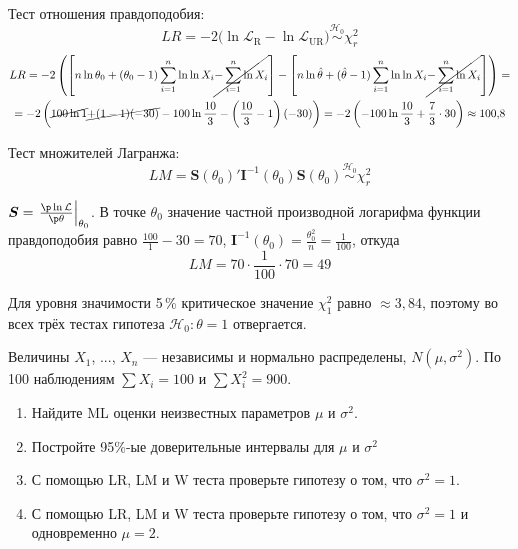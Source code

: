 \documentclass[pdftex,11pt,openany]{book}\usepackage[]{graphicx}\usepackage[]{color}
\newcommand{\calL}{\mathcal{L}}
\newcommand{\bs}[1]{\boldsymbol{#1}}
\newcommand{\hypo}{\mathcal{H}}
\newcommand{\simhypo}{\ensuremath{\mathrel{\stackrel{\hypo_0}{\sim}}}}
\begin{document}
\begin{solution}
Тест отношения правдоподобия:
\[
LR = -2 \bigl( \ln \calL_{\text{R}} - \ln \calL_{\text{UR}} \bigr) \simhypo \chi^2_r
\]
\begin{multline*}
LR = -2 \left( \left[n \ln \theta_0 + (\theta_0-1) \sum\limits_{i=1}^{n} \ln \ln X_i \cancel{- \sum\limits_{i=1}^{n} \ln X_i}\right] - \left[n \ln \hat\theta + (\hat\theta-1) \sum\limits_{i=1}^{n} \ln \ln X_i \cancel{- \sum\limits_{i=1}^{n} \ln X_i}\right] \right) = \\
= -2 \left( \cancel{100 \ln 1} \cancel{+ (1-1) (-30)}  - 100 \ln \frac{10}{3} - \left(\frac{10}{3}-1 \right) (-30)  \right) = -2 \left( - 100 \ln \frac{10}{3} + \frac73 \cdot 30  \right) \approx 100{,}8
\end{multline*}

Тест множителей Лагранжа:
\[
LM = \bs{S}({\theta}_0)' \bs{I}^{-1}({\theta}_{0}) \bs{S}({\theta}_{0}) \simhypo \chi^2_r
\]

$\bs{S} = \left.\frac{\p \ln \calL}{\p \theta}\right|_{\theta_0}$. В точке $\theta_0$ значение частной производной логарифма функции правдоподобия равно $\frac{100}{1} -30=70$, $\bs{I}^{-1}(\theta_0) = \frac{\theta^2_0}{n} = \frac{1}{100}$, откуда
\[
LM = 70\cdot \frac{1}{100} \cdot 70 = 49
\]

Для уровня значимости 5\,\% критическое значение $\chi^2_1$ равно $\approx3{,}84$, поэтому во всех трёх тестах гипотеза $\hypo_0\colon \theta=1$ отвергается.

\end{solution}


\begin{problem}
 Величины $X_{1}$, ..., $X_{n}$ --- независимы и нормально распределены, $N(\mu,\sigma^2)$. По 100 наблюдениям $\sum X_i=100$ и  $\sum X_i^2=900$.
\begin{enumerate}
\item Найдите ML оценки неизвестных параметров $\mu$ и $\sigma^2$.
\item Постройте 95\%-ые доверительные интервалы для $\mu$ и $\sigma^2$
\item С помощью LR, LM и W теста проверьте гипотезу о том, что $\sigma^2=1$.
\item С помощью LR, LM и W теста проверьте гипотезу о том, что $\sigma^2=1$ и одновременно $\mu=2$.
\end{enumerate}
\end{problem}
\end{document}
